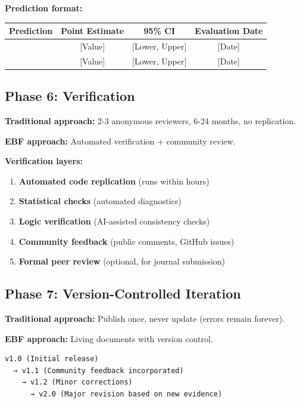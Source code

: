 \textbf{Prediction format:}
\begin{center}
\small
\begin{tabular}{@{}lccc@{}}
\toprule
\textbf{Prediction} & \textbf{Point Estimate} & \textbf{95\% CI} & \textbf{Evaluation Date} \\
\midrule
[Outcome 1] & [Value] & [Lower, Upper] & [Date] \\
[Outcome 2] & [Value] & [Lower, Upper] & [Date] \\
\bottomrule
\end{tabular}
\end{center}

\subsection{Phase 6: Verification}

\textbf{Traditional approach:} 2-3 anonymous reviewers, 6-24 months, no replication.

\textbf{EBF approach:} Automated verification + community review.

\textbf{Verification layers:}
\begin{enumerate}[nosep]
    \item \textbf{Automated code replication} (runs within hours)
    \item \textbf{Statistical checks} (automated diagnostics)
    \item \textbf{Logic verification} (AI-assisted consistency checks)
    \item \textbf{Community feedback} (public comments, GitHub issues)
    \item \textbf{Formal peer review} (optional, for journal submission)
\end{enumerate}

\subsection{Phase 7: Version-Controlled Iteration}

\textbf{Traditional approach:} Publish once, never update (errors remain forever).

\textbf{EBF approach:} Living documents with version control.

\begin{verbatim}
v1.0 (Initial release)
  → v1.1 (Community feedback incorporated)
    → v1.2 (Minor corrections)
      → v2.0 (Major revision based on new evidence)
\end{verbatim}

